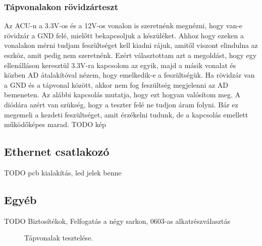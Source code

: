 \documentclass[a4paper, 12pt]{article}
\begin{document}
\subsubsection{Tápvonalakon rövidzárteszt}
Az ACU-n a 3.3V-os és a 12V-os vonalon is szeretnénk megnézni, hogy van-e rövidzár a GND felé, mielőtt bekapcsoljuk a készüléket. Ahhoz hogy ezeken a vonalakon mérni tudjam feszültséget kell kiadni rájuk, amitől viszont elindulna az eszköz, amit pedig nem szeretnénk. Ezért választottam azt a megoldást, hogy egy ellenálláson keresztül 3.3V-ra kapcsolom az egyik, majd a másik vonalat és közben AD átalakítóval nézem, hogy emelkedik-e a feszültségük. Ha rövidzár van a GND és a tápvonal között, akkor nem fog feszültség megjelenni az AD bemeneten. Az alábbi kapcsolás mutatja, hogy ezt hogyan valósítom meg. A diódára azért van szükség, hogy a teszter felé ne tudjon áram folyni. Bár ez megemeli a kezdeti feszültséget, amit érzékelni tudunk, de a kapcsolás emellett működőképes marad.
TODO kép

\subsection{Ethernet csatlakozó}
TODO pcb kialakítás, led jelek benne

\subsection{Egyéb}
TODO Biztosítékok, Felfogatás a négy sarkon, 0603-as alkatrészválasztás



\begin{figure}[H]
    \centering
    \caption{Tápvonalak tesztelése.}
\end{figure}
\end{document}
